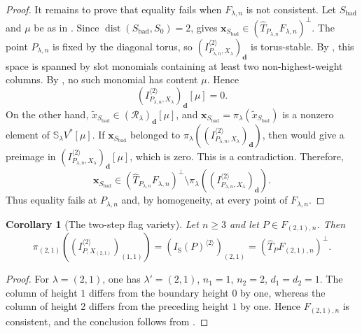 \documentclass[a4paper,reqno]{amsart}
\theoremstyle{plainnopunct}
\newtheorem{corollary}[corollary]{Corollary}
\theoremstyle{definitionnopunct}
\renewcommand{\S}{\mathbb{S}}
\newcommand{\cR}{\mathcal{R}}
\newcommand{\dist}{\operatorname{dist}}
\newcommand{\bx}{\mathbf{x}}
\newcommand{\bd}{\mathbf{d}}
\begin{document}
\begin{proof}
It remains to prove that equality fails when $F_{\lambda,n}$ is not
consistent. Let $S_{\mathrm{bad}}$ and $\mu$ be as in
. Since
$\dist(S_{\mathrm{bad}},S_0)=2$,
 gives
$
\bx_{S_{\mathrm{bad}}}
\in
\left(
\widehat T_{P_{\lambda,n}}F_{\lambda,n}
\right)^\perp$. The point $P_{\lambda,n}$ is fixed by the diagonal torus, so $\left(
I_{P_{\lambda,n},X_\lambda}^{\langle2\rangle}
\right)_{\bd}$
is torus-stable. By
, this space is
spanned by slot monomials containing at least two
non-highest-weight columns. By
, no such monomial has content
$\mu$. Hence
\[
\left(
I_{P_{\lambda,n},X_\lambda}^{\langle2\rangle}
\right)_{\bd}[\mu]
=
0.
\]
On the other hand,
$\widetilde{x}_{S_{\mathrm{bad}}}
\in
(\cR_\lambda)_{\bd}[\mu]$,
and
$
\bx_{S_{\mathrm{bad}}}
=
\pi_\lambda
\left(
\widetilde{x}_{S_{\mathrm{bad}}}
\right)$
is a nonzero element of $\S_\lambda V^*[\mu]$. If $\bx_{S_{\mathrm{bad}}}$ belonged to $\pi_\lambda
\left(
\left(
I_{P_{\lambda,n},X_\lambda}^{\langle2\rangle}
\right)_{\bd}
\right)$,
then
would give a preimage in
$
\left(
I_{P_{\lambda,n},X_\lambda}^{\langle2\rangle}
\right)_{\bd}[\mu]$,
which is zero. This is a contradiction. Therefore,
\[
\bx_{S_{\mathrm{bad}}}
\in
\left(
\widehat T_{P_{\lambda,n}}F_{\lambda,n}
\right)^\perp
\setminus
\pi_\lambda
\left(
\left(
I_{P_{\lambda,n},X_\lambda}^{\langle2\rangle}
\right)_{\bd}
\right).
\]
Thus equality fails at $P_{\lambda,n}$ and, by homogeneity, at every
point of $F_{\lambda,n}$.
\end{proof}

\begin{corollary}[The two-step flag variety]
\label{cor: consistency two step flag}
Let $n\geq3$ and let $P\in F_{(2,1),n}$.
Then
\[
\pi_{(2,1)}
\left(
\left(
I_{P,X_{(2,1)}}^{\langle2\rangle}
\right)_{(1,1)}
\right)
=
\left(
I_{\mathrm S}(P)^{\langle2\rangle}
\right)_{(2,1)}
=
\left(
\widehat T_PF_{(2,1),n}
\right)^\perp.
\]
\end{corollary}

\begin{proof}
For $\lambda=(2,1)$, one has $\lambda'=(2,1)$, $n_1=1$, $n_2=2$, $d_1=d_2=1$.
The column of height $1$ differs from the boundary height $0$ by one,
whereas the column of height $2$ differs from the preceding height
$1$ by one. Hence $F_{(2,1),n}$ is consistent, and the conclusion
follows from .
\end{proof}
\end{document}
